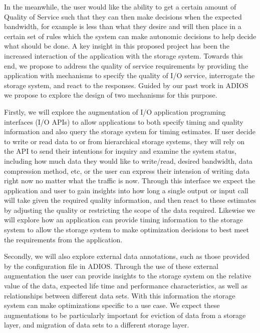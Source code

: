 In the meanwhile, the user would like the ability to get a certain amount of Quality of Service 
such that they can then make decisions when the expected bandwidth, 
for example is less than what they desire and will then place in a certain set 
of rules which the system can make autonomic decisions to help decide what should be done.
A key insight in this proposed project has been the increased interaction of
the application with the storage system. Towards this end, we propose to
address the quality of service requirements by providing the application
with mechanisms to specify the quality of I/O service, interrogate the
storage system, and react to the responses. Guided by our past work in
ADIOS \cite{lofstead2008flexible} we propose to explore the design of two
mechanisms for this purpose. 

Firstly, we will explore the augmentation of
I/O application programing interfaces (I/O APIs) to allow applications to
both specify timing and quality information and also query the storage
system for timing estimates. If user decide to write or read data to or from hierarchical storage systems, 
they will rely on the API to send their intentions for inquiry and examine the system status, 
including how much data they would like to write/read, desired bandwidth, data compression method, etc, 
or the user can express their intension of writing data right now no matter what the traffic is now.
Through this interface we expect the
application and user to gain insights into how long a single output or input
call will take given the required quality information, and then react to
these estimates by adjusting the quality or restricting the scope of the
data required. Likewise we will explore how an application can provide
timing information to the storage system to allow the storage system to make
optimization decisions to best meet the requirements from the application. 

Secondly, we will also explore external data annotations, such as those
provided by the configuration file in ADIOS. Through the use of these
external augmentation the user can provide insights to the storage system on
the relative value of the data, expected life time and performance
characteristics, as well as relationships between different data sets. With
this information the storage system can make optimizations specific to a use
case. We expect these augmentations to be particularly important for
eviction of data from a storage layer, and migration of data sets to a
different storage layer. 


